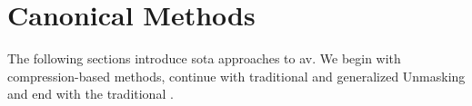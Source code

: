 \section{Canonical Methods}

The following sections introduce \acl{sota} approaches to \ac{av}.
We begin with compression-based methods, continue with traditional and generalized Unmasking and end with the traditional \impAppr{}.




  

